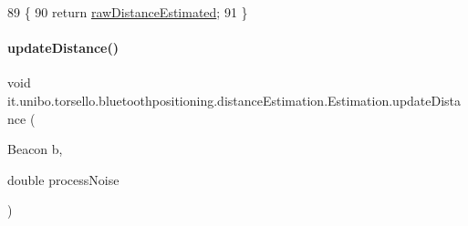 \begin{DoxyCode}
89                                    \{
90         \textcolor{keywordflow}{return} \hyperlink{classit_1_1unibo_1_1torsello_1_1bluetoothpositioning_1_1distanceEstimation_1_1Estimation_a5afcd0b9b73a92b64669f060206f35db_a5afcd0b9b73a92b64669f060206f35db}{rawDistanceEstimated};
91     \}
\end{DoxyCode}
\hypertarget{classit_1_1unibo_1_1torsello_1_1bluetoothpositioning_1_1distanceEstimation_1_1Estimation_aaf86439861db7facf3f5338ec2fc6cde_aaf86439861db7facf3f5338ec2fc6cde}{}\label{classit_1_1unibo_1_1torsello_1_1bluetoothpositioning_1_1distanceEstimation_1_1Estimation_aaf86439861db7facf3f5338ec2fc6cde_aaf86439861db7facf3f5338ec2fc6cde} 
\paragraph{\texorpdfstring{update\+Distance()}{updateDistance()}}
{\footnotesize\ttfamily void it.\+unibo.\+torsello.\+bluetoothpositioning.\+distance\+Estimation.\+Estimation.\+update\+Distance (\begin{DoxyParamCaption}\item[{Beacon}]{b,  }\item[{double}]{process\+Noise }\end{DoxyParamCaption})}


